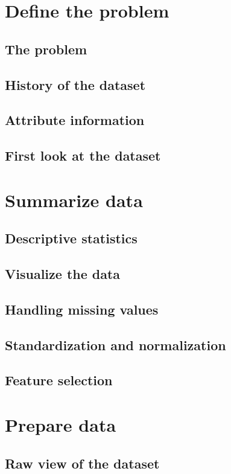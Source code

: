 \chapter{Define the problem}

\section{The problem}
\section{History of the dataset}
\section{Attribute information}
\section{First look at the dataset}

\chapter{Summarize data}

\section{Descriptive statistics}
\section{Visualize the data}
\section{Handling missing values}
\section{Standardization and normalization}
\section{Feature selection}

\chapter{Prepare data}

\section{Raw view of the dataset}
